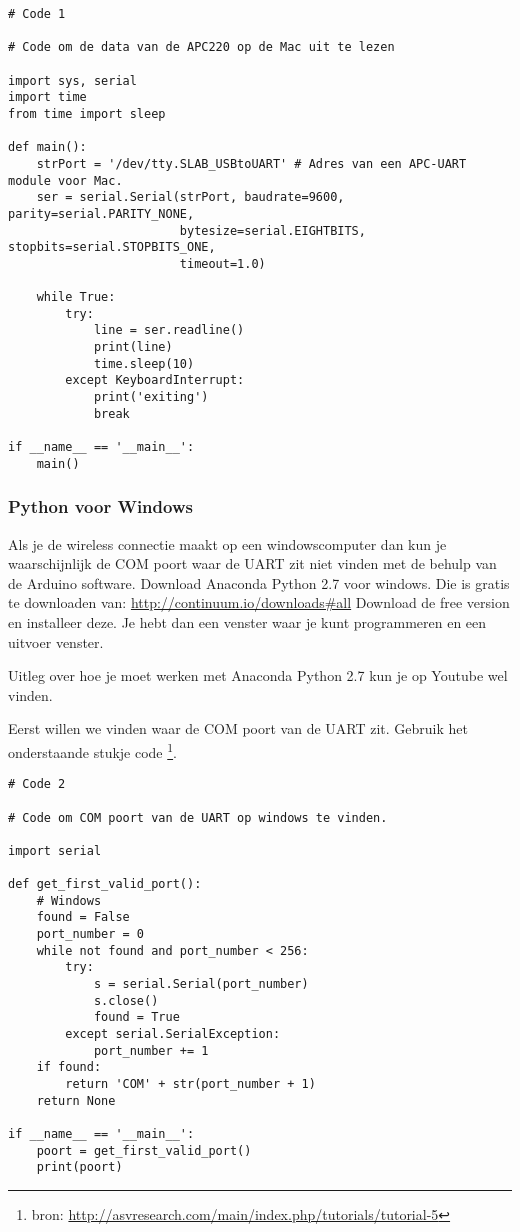 \begin{verbatim}
# Code 1

# Code om de data van de APC220 op de Mac uit te lezen

import sys, serial
import time
from time import sleep
      
def main():
    strPort = '/dev/tty.SLAB_USBtoUART' # Adres van een APC-UART module voor Mac. 
    ser = serial.Serial(strPort, baudrate=9600, parity=serial.PARITY_NONE, 
                        bytesize=serial.EIGHTBITS, stopbits=serial.STOPBITS_ONE,
                        timeout=1.0)
    
    while True:
        try:
            line = ser.readline()
            print(line)
            time.sleep(10)
        except KeyboardInterrupt:
            print('exiting')
            break

if __name__ == '__main__':
    main()
\end{verbatim}


\subsubsection{Python voor Windows}

Als je de wireless connectie maakt op een windowscomputer dan kun je 
waarschijnlijk de COM poort waar de UART zit niet vinden met de behulp van de 
Arduino software. Download Anaconda Python 2.7 voor windows.
Die is gratis te downloaden van: \url{http://continuum.io/downloads#all}
Download de free version en installeer deze. Je hebt dan een venster waar je kunt
programmeren en een uitvoer venster.

Uitleg over hoe je moet werken met Anaconda Python 2.7 kun je op Youtube wel vinden.

Eerst willen we vinden waar de COM poort van de UART zit. Gebruik het onderstaande 
stukje code \footnote{bron: \url{http://asvresearch.com/main/index.php/tutorials/tutorial-5}}.

\begin{verbatim}
# Code 2

# Code om COM poort van de UART op windows te vinden.

import serial
 
def get_first_valid_port():
    # Windows
    found = False
    port_number = 0
    while not found and port_number < 256:
        try:
            s = serial.Serial(port_number)
            s.close()
            found = True
        except serial.SerialException:
            port_number += 1
    if found:
        return 'COM' + str(port_number + 1)
    return None

if __name__ == '__main__': 
    poort = get_first_valid_port()
    print(poort)
\end{verbatim}


